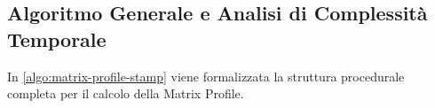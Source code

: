 \begin{table}[H]
\centering
\small
\caption{Traccia numerica delle prime due iterazioni dell'algoritmo Matrix Profile su vettore a 19 celle.}
\label{tab:ts-stamp-trace}
\vspace{2mm}
\end{table}

\FloatBarrier
\subsection{Algoritmo Generale e Analisi di Complessit\`a Temporale}
\label{subsec:ts-algo-stamp-complexity}

In \autoref{algo:matrix-profile-stamp} viene formalizzata la struttura procedurale completa per il calcolo della Matrix Profile.

